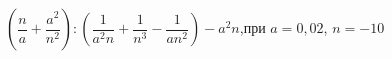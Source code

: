 \begin{ex}[type=expr_calc]
	\begin{condition}
		\( \left( \dfrac{n}{a}+\dfrac{a^2}{n^2} \right):\left( \dfrac{1}{a^2n}+\dfrac{1}{n^3}-\dfrac{1}{an^2} \right)-a^2n \),\quad при \( a=0,02 \), \( n=-10 \)
	\end{condition}
\end{ex}